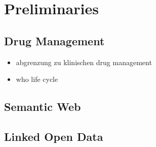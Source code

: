 \chapter{Preliminaries}
\label{cha:prelims}

\section{Drug Management}
\label{sec:drug-management}
\begin{itemize}
\item abgrenzung zu klinischen drug management
\item who life cycle
\end{itemize}

\section{Semantic Web}
\label{sec:semantic-web}

\section{Linked Open Data}
\label{sec:linked-open-data}

